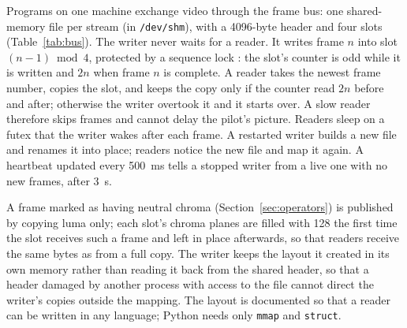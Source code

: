 \documentclass[a4paper,fleqn]{cas-sc}
\begin{document}
Programs on one machine exchange video through the frame bus: one shared-memory file
per stream (in \texttt{/dev/shm}), with a 4096-byte header and four slots
(Table~\ref{tab:bus}). The writer never waits for a reader. It writes frame $n$ into
slot $(n-1) \bmod 4$, protected by a sequence lock \citep{boehm2012}: the slot's
counter is odd while it is written and $2n$ when frame $n$ is complete. A reader
takes the newest frame number, copies the slot, and keeps the copy only if the
counter read $2n$ before and after; otherwise the writer overtook it and it starts
over. A slow reader therefore skips frames and cannot delay the pilot's picture.
Readers sleep on a futex \citep{franke2002} that the writer wakes after each frame. A
restarted writer builds a new file and renames it into place; readers notice the new
file and map it again. A heartbeat updated every 500~ms tells a stopped writer from a
live one with no new frames, after 3~s.

A frame marked as having neutral chroma (Section~\ref{sec:operators}) is published by
copying luma only; each slot's chroma planes are filled with 128 the first time the slot
receives such a frame and left in place afterwards, so that readers receive the same
bytes as from a full copy. The writer keeps the layout it created in its own memory
rather than reading it back from the shared header, so that a header damaged by
another process with access to the file cannot direct the writer's copies outside the
mapping. The layout is documented so that a reader can be written in any language;
Python needs only \texttt{mmap} and \texttt{struct}.
\end{document}
